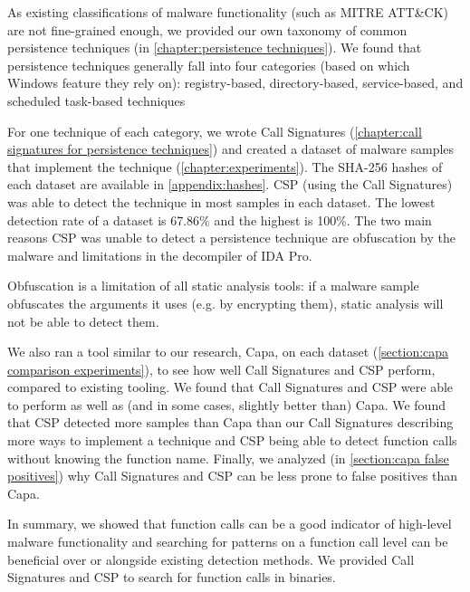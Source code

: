As existing classifications of malware functionality (such as MITRE ATT\&CK) are not fine-grained enough, we provided our own taxonomy of common persistence techniques (in \autoref{chapter:persistence techniques}). We found that persistence techniques generally fall into four categories (based on which Windows feature they rely on): registry-based, directory-based, service-based, and scheduled task-based techniques

For one technique of each category, we wrote Call Signatures (\autoref{chapter:call signatures for persistence techniques}) and created a dataset of malware samples that implement the technique (\autoref{chapter:experiments}). The SHA-256 hashes of each dataset are available in \autoref{appendix:hashes}. CSP (using the Call Signatures) was able to detect the technique in most samples in each dataset. The lowest detection rate of a dataset is 67.86\% and the highest is 100\%. The two main reasons CSP was unable to detect a persistence technique are obfuscation by the malware and limitations in the decompiler of IDA Pro.

Obfuscation is a limitation of all static analysis tools: if a malware sample obfuscates the arguments it uses (e.g. by encrypting them), static analysis will not be able to detect them.

\medskip

We also ran a tool similar to our research, Capa, on each dataset (\autoref{section:capa comparison experiments}), to see how well Call Signatures and CSP perform, compared to existing tooling. We found that Call Signatures and CSP were able to perform as well as (and in some cases, slightly better than) Capa. We found that CSP detected more samples than Capa than our Call Signatures describing more ways to implement a technique and CSP being able to detect function calls without knowing the function name. Finally, we analyzed (in \autoref{section:capa false positives}) why Call Signatures and CSP can be less prone to false positives than Capa.

\medskip

In summary, we showed that function calls can be a good indicator of high-level malware functionality and searching for patterns on a function call level can be beneficial over or alongside existing detection methods. We provided Call Signatures and CSP to search for function calls in binaries.

